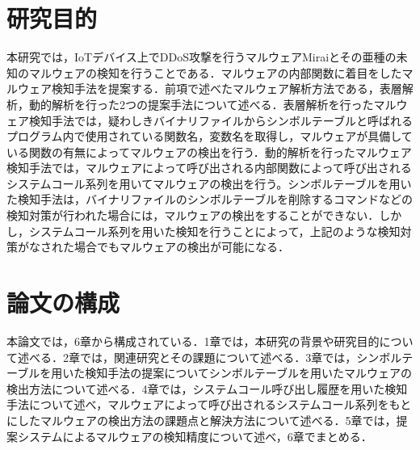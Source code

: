 \section{研究目的}
本研究では，IoTデバイス上でDDoS攻撃を行うマルウェアMiraiとその亜種の未知のマルウェアの検知を行うことである．マルウェアの内部関数に着目をしたマルウェア検知手法を提案する．前項で述べたマルウェア解析方法である，表層解析，動的解析を行った2つの提案手法について述べる．表層解析を行ったマルウェア検知手法では，疑わしきバイナリファイルからシンボルテーブルと呼ばれるプログラム内で使用されている関数名，変数名を取得し，マルウェアが具備している関数の有無によってマルウェアの検出を行う．動的解析を行ったマルウェア検知手法では，マルウェアによって呼び出される内部関数によって呼び出されるシステムコール系列を用いてマルウェアの検出を行う。シンボルテーブルを用いた検知手法は，バイナリファイルのシンボルテーブルを削除するコマンドなどの検知対策が行われた場合には，マルウェアの検出をすることができない．しかし，システムコール系列を用いた検知を行うことによって，上記のような検知対策がなされた場合でもマルウェアの検出が可能になる．
　
\section{論文の構成}
本論文では，6章から構成されている．1章では，本研究の背景や研究目的について述べる．2章では，関連研究とその課題について述べる．3章では，シンボルテーブルを用いた検知手法の提案についてシンボルテーブルを用いたマルウェアの検出方法について述べる．4章では，システムコール呼び出し履歴を用いた検知手法について述べ，マルウェアによって呼び出されるシステムコール系列をもとにしたマルウェアの検出方法の課題点と解決方法について述べる．5章では，提案システムによるマルウェアの検知精度について述べ，6章でまとめる．%